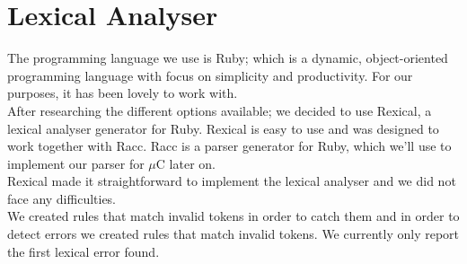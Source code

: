 







\section{Lexical Analyser}
\noindent
The programming language we use is Ruby; which is a dynamic, object-oriented programming language with focus on simplicity and productivity. For our purposes, it has been lovely to work with.\\

\noindent
After researching the different options available; we decided to use Rexical, a lexical analyser generator for Ruby. Rexical is easy to use and was designed to work together with Racc. Racc is a parser generator for Ruby, which we'll use to implement our parser for $\mu$C later on.\\

\noindent
Rexical made it straightforward to implement the lexical analyser and we did not face any difficulties.\\

\noindent
We created rules that match invalid tokens in order to catch them and
in order to detect errors we created rules that match invalid tokens.
We currently only report the first lexical error found.\\

